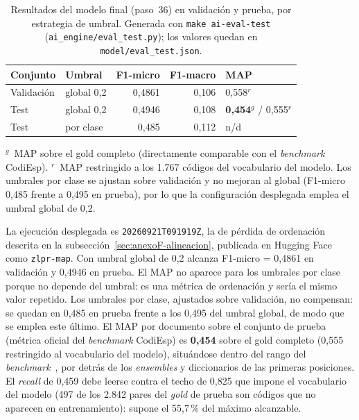 \begin{table}[h]
\centering
\caption{Resultados del modelo final (paso~36) en validación y prueba, por estrategia de umbral. Generada con \texttt{make ai-eval-test} (\texttt{ai\_engine/eval\_test.py}); los valores quedan en \texttt{model/eval\_test.json}.}
\label{tab:final-results}
\begin{tabular}{llrrl}
\hline
\textbf{Conjunto} & \textbf{Umbral} & \textbf{F1-micro} & \textbf{F1-macro} & \textbf{MAP} \\
\hline
Validación & global 0,2 & 0{,}4861 & 0{,}106 & 0{,}558$^{r}$ \\
Test       & global 0,2 & 0{,}4946 & 0{,}108 & \textbf{0{,}454}$^{g}$ / 0{,}555$^{r}$ \\
Test       & por clase  & 0{,}485  & 0{,}112 & n/d \\
\hline
\end{tabular}

\smallskip\par\footnotesize $^{g}$~MAP sobre el gold completo (directamente comparable con el \emph{benchmark} CodiEsp). $^{r}$~MAP restringido a los 1.767 códigos del vocabulario del modelo. Los umbrales por clase se ajustan sobre validación y no mejoran al global (F1-micro 0,485 frente a 0,495 en prueba), por lo que la configuración desplegada emplea el umbral global de 0,2.
\end{table}

La ejecución desplegada es \texttt{20260921T091919Z}, la de pérdida de ordenación descrita en la subsección~\ref{sec:anexoF-alineacion}, publicada en Hugging Face como \texttt{zlpr-map}. Con umbral global de 0,2 alcanza F1-micro = 0{,}4861 en validación y 0{,}4946 en prueba. El MAP no aparece para los umbrales por clase porque no depende del umbral: es una métrica de ordenación y sería el mismo valor repetido. Los umbrales por clase, ajustados sobre validación, no compensan: se quedan en 0,485 en prueba frente a los 0,495 del umbral global, de modo que se emplea este último. El MAP por documento sobre el conjunto de prueba (métrica oficial del \emph{benchmark} CodiEsp) es \textbf{0{,}454} sobre el gold completo (0{,}555 restringido al vocabulario del modelo), situándose dentro del rango del \emph{benchmark}~\cite{miranda2020}, por detrás de los \emph{ensembles} y diccionarios de las primeras posiciones. El \emph{recall} de 0,459 debe leerse contra el techo de 0,825 que impone el vocabulario del modelo (497 de los 2.842 pares del \emph{gold} de prueba son códigos que no aparecen en entrenamiento): supone el 55,7\,\% del máximo alcanzable.

